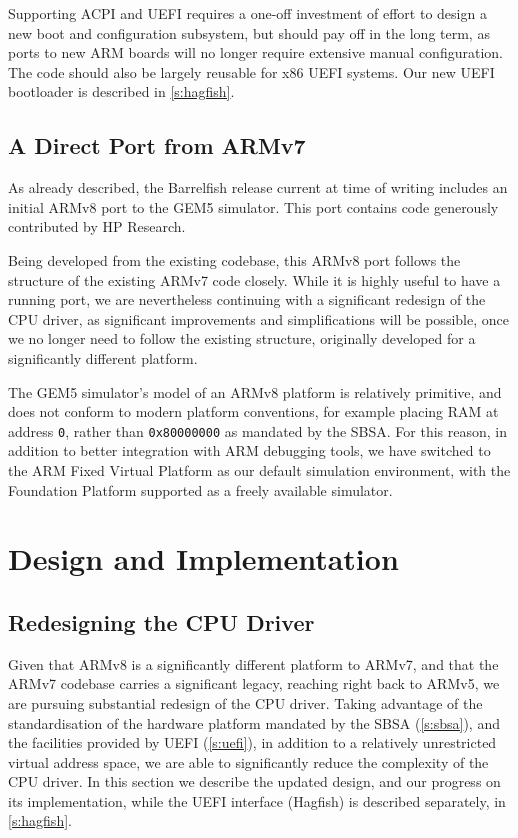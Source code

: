 \documentclass[a4paper,twoside]{report}
\begin{document}
Supporting ACPI and UEFI requires a one-off investment of effort to design a
new boot and configuration subsystem, but should pay off in the long term, as
ports to new ARM boards will no longer require extensive manual configuration.
The code should also be largely reusable for x86 UEFI systems. Our new UEFI
bootloader is described in \autoref{s:hagfish}.

\section{A Direct Port from ARMv7}

As already described, the Barrelfish release current at time of writing
includes an initial ARMv8 port to the GEM5 simulator. This port contains code
generously contributed by HP Research.

Being developed from the existing codebase, this ARMv8 port follows the
structure of the existing ARMv7 code closely. While it is highly useful to
have a running port, we are nevertheless continuing with a significant
redesign of the CPU driver, as significant improvements and simplifications
will be possible, once we no longer need to follow the existing structure,
originally developed for a significantly different platform.

The GEM5 simulator's model of an ARMv8 platform is relatively primitive, and
does not conform to modern platform conventions, for example placing RAM at
address \texttt{0}, rather than \texttt{0x80000000} as mandated by the SBSA.
For this reason, in addition to better integration with ARM debugging tools,
we have switched to the ARM Fixed Virtual Platform as our default simulation
environment, with the Foundation Platform supported as a freely available
simulator.

\chapter{Design and Implementation}\label{c:design}

\section{Redesigning the CPU Driver}

Given that ARMv8 is a significantly different platform to ARMv7, and that the
ARMv7 codebase carries a significant legacy, reaching right back to ARMv5, we
are pursuing substantial redesign of the CPU driver. Taking advantage of the
standardisation of the hardware platform mandated by the SBSA
(\autoref{s:sbsa}), and the facilities provided by UEFI (\autoref{s:uefi}), in
addition to a relatively unrestricted virtual address space, we are able to
significantly reduce the complexity of the CPU driver.  In this section we
describe the updated design, and our progress on its implementation, while the
UEFI interface (Hagfish) is described separately, in \autoref{s:hagfish}.
\end{document}
